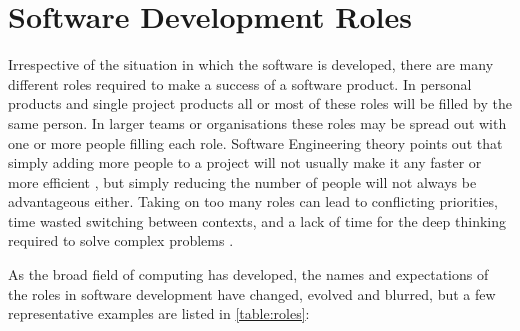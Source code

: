 \section{Software Development Roles}
\label{section:software development roles}

Irrespective of the situation in which the software is developed, there are many different roles required to make a success of a software product. In personal products and single project products all or most of these roles will be filled by the same person. In larger teams or organisations these roles may be spread out with one or more people filling each role. Software Engineering theory points out that simply adding more people to a project will not usually make it any faster or more efficient \citep{Brooks1995}, but simply reducing the number of people will not always be advantageous either. Taking on too many roles can lead to conflicting priorities, time wasted switching between contexts, and a lack of time for the deep thinking  required to solve complex problems \citep{Newport2016}.

As the broad field of computing has developed, the names and expectations of the roles in software development have changed, evolved and blurred, but a few representative examples are listed in \autoref{table:roles}:

